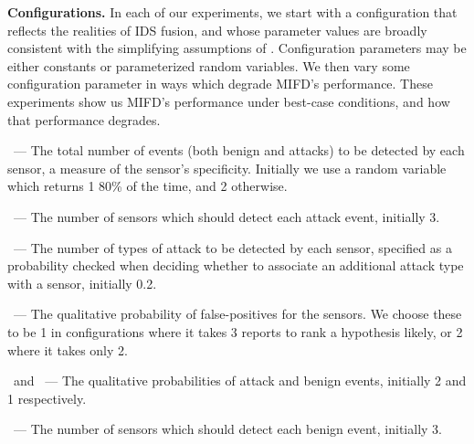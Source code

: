 \textbf{Configurations.}
\label{sec-5-1}
In each of our experiments, we start with a configuration that reflects the
realities of IDS fusion, and whose parameter values are broadly consistent with
the simplifying assumptions of \zplus.
Configuration parameters may be either constants or parameterized random
variables.
We then vary some configuration parameter in ways which degrade
MIFD's performance. These experiments show us MIFD's performance under best-case conditions, and
how that performance degrades.
\begin{compactitem}
\item \numEventProtosDetected\ --- The total number of events (both
  benign and attacks) to be
  detected by each sensor, a measure of the sensor's specificity.
  Initially we use a random variable which returns 1 80\%
  of the time, and 2 otherwise.
\item \sensorToAttackRatio\ --- The number of sensors which should
  detect each attack event, initially 3.
\item \sensorOverlap\ --- The number of types of attack to be detected by each
  sensor, specified as a probability checked when deciding whether to
  associate an additional attack type with a sensor, initially 0.2.
\item \fpKappa\ --- The qualitative probability of
  false-positives for the sensors. We choose these to be 1
  in configurations where it takes 3 reports to rank a hypothesis likely, or 2
  where it takes only 2.
% 
%
%
\item \attackKappa\ and \benignKappa\ --- The qualitative
  probabilities of attack and benign events, initially
  2 and 1 respectively.


\item \sensorToBenignRatio\ --- The number of sensors which should
  detect each benign event, initially 3.


\end{compactitem}
